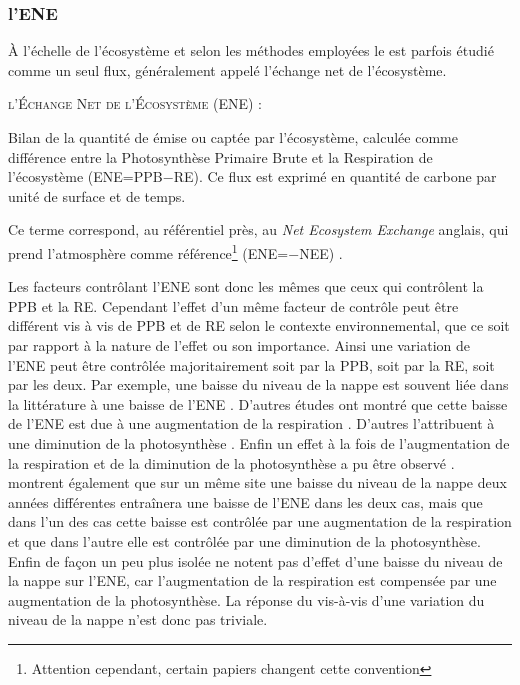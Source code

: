 \subsubsection{l'ENE}

À l'échelle de l'écosystème et selon les méthodes employées le \coo est parfois étudié comme un seul flux, généralement appelé l'échange net de l'écosystème.

\begin{pdef}
\textsc{l'Échange Net de l'Écosystème (ENE)} :

Bilan de la quantité de \coo émise ou captée par l'écosystème, calculée comme  différence entre la Photosynthèse Primaire Brute et la Respiration de l'écosystème (ENE=PPB$-$RE).
Ce flux est exprimé en quantité de carbone par unité de surface et de temps.
\end{pdef}
Ce terme correspond, au référentiel près, au \textit{Net Ecosystem Exchange} anglais, qui prend l'atmosphère comme référence\footnote{Attention cependant, certain papiers changent cette convention} (ENE=$-$NEE) \citep{chapin2006}.

Les facteurs contrôlant l'ENE sont donc les mêmes que ceux qui contrôlent la PPB et la RE.
Cependant l'effet d'un même facteur de contrôle peut être différent vis à vis de PPB et de RE selon le contexte environnemental, que ce soit par rapport à la nature de l'effet ou son importance.
Ainsi une variation de l'ENE peut être contrôlée majoritairement soit par la PPB, soit par la RE, soit par les deux.
Par exemple, une baisse du niveau de la nappe est souvent liée dans la littérature à une baisse de l'ENE \plop.
D'autres études ont montré que cette baisse de l'ENE est due à une augmentation de la respiration \citep{alm1999, ise2008}.
D'autres l'attribuent à une diminution de la photosynthèse \citep{sonnentag2010,peichl2014}.
Enfin un effet à la fois de l'augmentation de la respiration et de la diminution de la photosynthèse a pu être observé \citep{strack2013}.
\citet{lund2012} montrent également que sur un même site une baisse du niveau de la nappe deux années différentes entraînera une baisse de l'ENE dans les deux cas, mais que dans l'un des cas cette baisse est contrôlée par une augmentation de la respiration et que dans l'autre elle est contrôlée par une diminution de la photosynthèse.
Enfin de façon un peu plus isolée \citet{ballantyne2014} ne notent pas d'effet d'une baisse du niveau de la nappe sur l'ENE, car l'augmentation de la respiration est compensée par une augmentation de la photosynthèse.
La réponse du \coo vis-à-vis d'une variation du niveau de la nappe n'est donc pas triviale.

